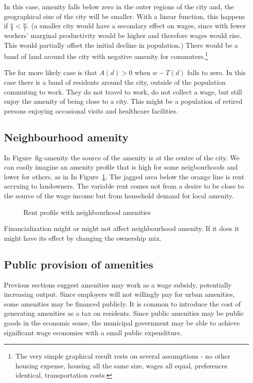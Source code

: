 In this case, amenity falls below zero in the outer regions of the city and, the geographical size of the city will be smaller. With a linear function, this happens if $\frac{a}{b} < \frac{w}{t}$. (a smaller city would have a secondary effect on wages, since with fewer workers' marginal productivity would be higher and therefore wages would rise. This would partially offset the initial decline in population.)
There would be a band of land around the city with negative amenity for commuters.\footnote{The very simple graphical result rests on several assumptions - no other housing expense, housing all the same size, wages all equal, preferences identical, transportation costs.}

The far more likely case is that $A(d) > 0$ when $w-T(d)$ falls to zero. In this case there is a band of residents around the city, outside of the population commuting to work. They do not travel to work,  do not collect a wage, but still enjoy the amenity of being close to a city. This might be a population of retired persons enjoying occasional visits and healthcare facilities.


\subsection{Neighbourhood amenity}
In Figure~{fig-amenity} the source of the amenity is at the centre of the city. We can easily imagine an amenity profile that is high for some neigbourhoods and lower for others, as in  In Figure~\ref{fig-amenity2}. The jagged area below the orange line is rent accruing to landowners. The variable rent comes not from a desire to be close to the source of the wage income but from household demand for local amenity.  
\begin{figure}[tb]
\begin{center}

\end{center}
\caption{Rent profile with neighbourhood amenities}
\label{fig-amenity2}
\end{figure}
Financialization might or might not affect neighbourhood amenity. If it does it might have its effect by changing the ownership mix.

\subsection{Public provision of amenities}

Previous sections suggest amenities may work as a wage subsidy, potentially increasing output. Since employers will not willingly pay for urban amenities, some amenities may be financed publicly. It is common to introduce the cost of generating amenities as a tax on residents.  Since public amenities may be \glspl{public good} in the economic sense, the municipal government may be able to achieve significant wage economies with a small public expenditure.


